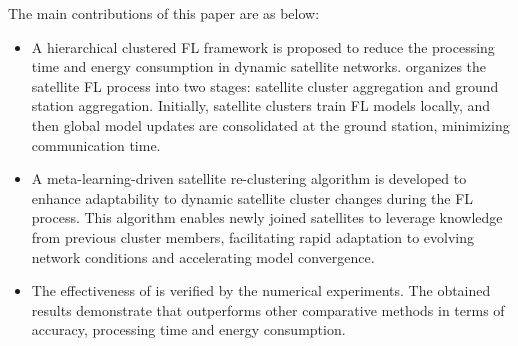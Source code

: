 The main contributions of this paper are as below:
\begin{itemize}
    \item A hierarchical clustered FL framework \algname is proposed to reduce the processing time and energy consumption in dynamic satellite networks. \algname organizes the satellite FL process into two stages: satellite cluster aggregation and ground station aggregation. Initially, satellite clusters train FL models locally, and then global model updates are consolidated at the ground station, minimizing communication time.



    

    \item A meta-learning-driven satellite re-clustering algorithm is developed to enhance adaptability to dynamic satellite cluster changes during the FL process. This algorithm enables newly joined satellites to leverage knowledge from previous cluster members, facilitating rapid adaptation to evolving network conditions and accelerating model convergence.
    
    
    \item The effectiveness of \algname is verified by the numerical experiments. The obtained results demonstrate that \algname outperforms other comparative methods in terms of accuracy, processing time and energy consumption. 

\end{itemize}

